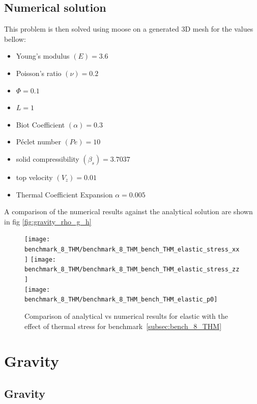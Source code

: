 \documentclass[]{scrreprt}
\begin{document}
\subsection{Numerical solution}
This problem is then solved using moose on a generated 3D mesh for the values bellow:
\begin{itemize}
\item Young's modulus $(E)=3.6$\
\item Poisson's ratio $(\nu) =0.2$\
\item $\Phi=0.1$\
\item $L=1$\
\item Biot Coefficient $(\alpha)=0.3$\
\item P\'{e}clet number $(Pe)=10$\
\item solid compressibility $(\beta_s)=3.7037$\
\item top velocity $(V_z) =0.01$\
\item Thermal Coefficient Expansion $\alpha=0.005$\

\end{itemize}
A comparison of the numerical results against the analytical solution are shown in fig \ref{fig:gravity_rho_g_h}
\begin{figure}
\label{fig:benchmark8_THM_elastic}
  \centering
  \texttt{[image: benchmark\_8\_THM/benchmark\_8\_THM\_bench\_THM\_elastic\_stress\_xx]}
  \texttt{[image: benchmark\_8\_THM/benchmark\_8\_THM\_bench\_THM\_elastic\_stress\_zz]}\\
  \texttt{[image: benchmark\_8\_THM/benchmark\_8\_THM\_bench\_THM\_elastic\_p0]}
  \caption{ Comparison of analytical vs numerical results for elastic with the effect of thermal stress for benchmark~\ref{subsec:bench_8_THM}}
 \end{figure}


\section{Gravity}
\subsection{Gravity}
\label{subsec:gravity rho g h}
\end{document}
